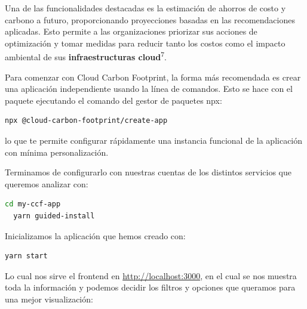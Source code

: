 \documentclass[12pt,a4paper]{report}
\begin{document}
Una de las funcionalidades destacadas es la estimación de ahorros de costo y carbono a futuro, proporcionando proyecciones basadas en las recomendaciones aplicadas. Esto permite a las organizaciones priorizar sus acciones de optimización y tomar medidas para reducir tanto los costos como el impacto ambiental de sus \textbf{infraestructuras cloud}\textsuperscript{7}.

Para comenzar con Cloud Carbon Footprint, la forma más recomendada es crear una aplicación independiente usando la línea de comandos. Esto se hace con el paquete ejecutando el comando del gestor de paquetes npx:

\begin{tcolorbox}[colback=codebackground, colframe=codeborder, boxrule=0.8pt, arc=0mm, boxsep=5pt, left=5pt, right=5pt, top=5pt, bottom=5pt]
  \begin{lstlisting}[language=bash]
  npx @cloud-carbon-footprint/create-app
  \end{lstlisting}
\end{tcolorbox}

lo que te permite configurar rápidamente una instancia funcional de la aplicación con mínima personalización.

Terminamos de configurarlo con nuestras cuentas de los distintos servicios que queremos analizar con:

\begin{tcolorbox}[colback=codebackground, colframe=codeborder, boxrule=0.8pt, arc=0mm, boxsep=5pt, left=5pt, right=5pt, top=5pt, bottom=5pt]
  \begin{lstlisting}[language=bash]
  cd my-ccf-app
  yarn guided-install
  \end{lstlisting}
\end{tcolorbox}

Inicializamos la aplicación que hemos creado con:

\begin{tcolorbox}[colback=codebackground, colframe=codeborder, boxrule=0.8pt, arc=0mm, boxsep=5pt, left=5pt, right=5pt, top=5pt, bottom=5pt]
  \begin{lstlisting}[language=bash]
  yarn start
  \end{lstlisting}
\end{tcolorbox}

Lo cual nos sirve el frontend en \href{http://localhost:3000}{http://localhost:3000}, en el cual se nos muestra toda la información y podemos decidir los filtros y opciones que queramos para una mejor visualización:
\end{document}
